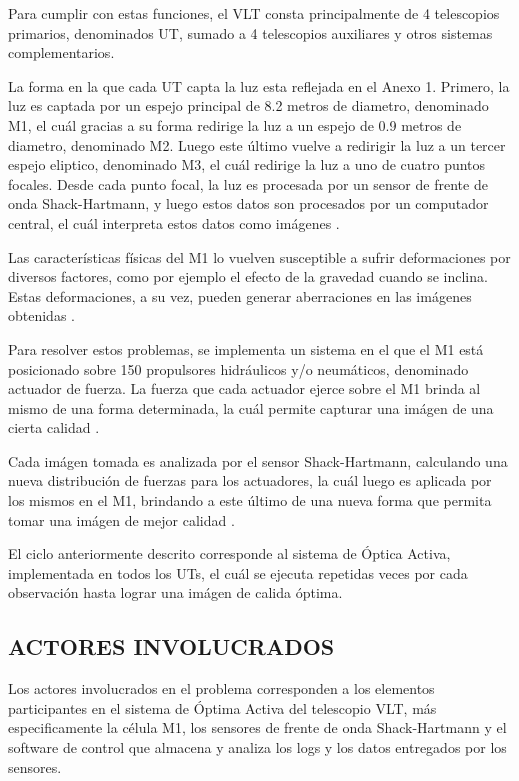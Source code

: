Para cumplir con estas funciones, el VLT consta principalmente de 4 telescopios primarios, denominados UT, sumado a 4 telescopios auxiliares y otros sistemas complementarios\cite{eso1998vlt}.

La forma en la que cada UT capta la luz esta reflejada en el Anexo 1. Primero, la luz es captada por un espejo principal de 8.2 metros de diametro, denominado M1, el cuál gracias a su forma redirige la luz a un espejo de 0.9 metros de diametro, denominado M2. Luego este último vuelve a redirigir la luz a un tercer espejo eliptico, denominado M3, el cuál redirige la luz a uno de cuatro puntos focales. Desde cada punto focal, la luz es procesada por un sensor de frente de onda Shack-Hartmann, y luego estos datos son procesados por un computador central, el cuál interpreta estos datos como imágenes \cite{eso1998vlt}.

Las características físicas del M1 lo vuelven susceptible a sufrir deformaciones por diversos factores, como por ejemplo el efecto de la gravedad cuando se inclina. Estas deformaciones, a su vez, pueden generar aberraciones en las imágenes obtenidas \cite{wilson1987active}.

Para resolver estos problemas, se implementa un sistema en el que el M1 está posicionado sobre 150 propulsores hidráulicos y/o neumáticos, denominado actuador de fuerza. La fuerza que cada actuador ejerce sobre el M1 brinda al mismo de una forma determinada, la cuál permite capturar una imágen de una cierta calidad \cite{eso1998vlt}. 

Cada imágen tomada es analizada por el sensor Shack-Hartmann, calculando una nueva distribución de fuerzas para los actuadores, la cuál luego es aplicada por los mismos en el M1, brindando a este último de una nueva forma que permita tomar una imágen de mejor calidad \cite{eso1998vlt}. 

El ciclo anteriormente descrito corresponde al sistema de Óptica Activa, implementada en todos los UTs, el cuál se ejecuta repetidas veces por cada observación hasta lograr una imágen de calida óptima\cite{eso1998vlt}.

\subsection{ACTORES INVOLUCRADOS}

Los actores involucrados en el problema corresponden a los elementos participantes en el sistema de Óptima Activa del telescopio VLT, más especificamente la célula M1, los sensores de frente de onda Shack-Hartmann y el software de control que almacena y analiza los logs y los datos entregados por los sensores\cite{eso2011vlt}.

